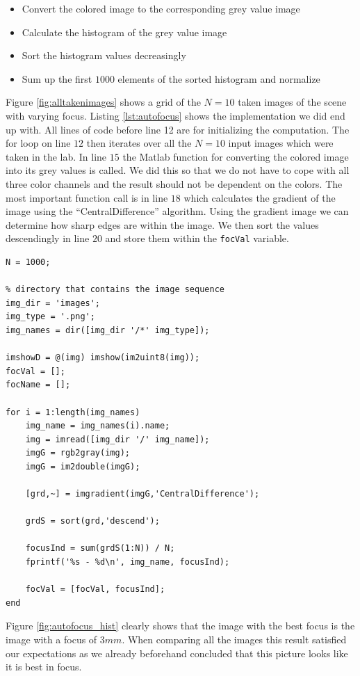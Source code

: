 \documentclass[
a4paper,     %
12pt         %
]{scrartcl}  %
\begin{document}
\begin{itemize}
 \item Convert the colored image to the corresponding grey value image
 \item Calculate the histogram of the grey value image
 \item Sort the histogram values decreasingly
 \item Sum up the first $1000$ elements of the sorted histogram and normalize
\end{itemize}

Figure \ref{fig:alltakenimages} shows a grid of the $N=10$ taken images of the scene with varying focus.
Listing \ref{lst:autofocus} shows the implementation we did end up with.
All lines of code before line 12 are for initializing the computation.
The for loop on line $12$ then iterates over all the $N=10$ input images which were taken in the lab.
In line $15$ the Matlab function for converting the colored image into its grey values is called.
We did this so that we do not have to cope with all three color channels and the result should not be dependent on the colors.
The most important function call is in line $18$ which calculates the gradient of the image using the ``CentralDifference'' algorithm.
Using the gradient image we can determine how sharp edges are within the image.
We then sort the values descendingly in line $20$ and store them within the \lstinline{focVal} variable.

\begin{lstlisting}[label=lst:autofocus, caption=Matlab script for calculating best focus value]
N = 1000;

% directory that contains the image sequence
img_dir = 'images';
img_type = '.png';
img_names = dir([img_dir '/*' img_type]);

imshowD = @(img) imshow(im2uint8(img));
focVal = [];
focName = [];

for i = 1:length(img_names)
    img_name = img_names(i).name;
    img = imread([img_dir '/' img_name]);
    imgG = rgb2gray(img);
    imgG = im2double(imgG);
    
    [grd,~] = imgradient(imgG,'CentralDifference');
    
    grdS = sort(grd,'descend');
    
    focusInd = sum(grdS(1:N)) / N;
    fprintf('%s - %d\n', img_name, focusInd);
    
    focVal = [focVal, focusInd];
end
\end{lstlisting}

Figure \ref{fig:autofocus_hist} clearly shows that the image with the best focus is the image with a focus of $3mm$.
When comparing all the images this result satisfied our expectations as we already beforehand concluded that this picture looks like it is best in focus.
\end{document}
